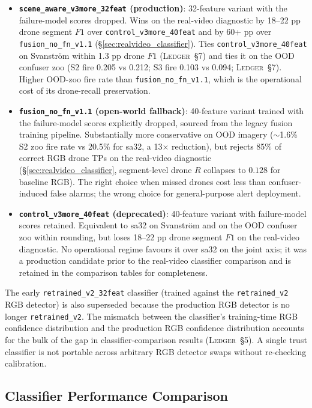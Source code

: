 \documentclass[12pt,a4paper,oneside,openright]{book}
\begin{document}
\begin{itemize}
    \item \textbf{\texttt{scene\_aware\_v3more\_32feat} (production)}: 32-feature variant with the failure-model scores dropped. Wins on the real-video diagnostic by 18--22 pp drone segment $F1$ over \texttt{control\_v3more\_40feat} and by 60+ pp over \texttt{fusion\_no\_fn\_v1.1} (\S\ref{sec:realvideo_classifier}). Ties \texttt{control\_v3more\_40feat} on Svanstr\"om within 1.3 pp drone $F1$ (\textsc{Ledger}~\S7) and ties it on the OOD confuser zoo (S2 fire 0.205 vs 0.212; S3 fire 0.103 vs 0.094; \textsc{Ledger}~\S7). Higher OOD-zoo fire rate than \texttt{fusion\_no\_fn\_v1.1}, which is the operational cost of its drone-recall preservation.
    \item \textbf{\texttt{fusion\_no\_fn\_v1.1} (open-world fallback)}: 40-feature variant trained with the failure-model scores explicitly dropped, sourced from the legacy fusion training pipeline. Substantially more conservative on OOD imagery ($\sim$1.6\% S2 zoo fire rate vs 20.5\% for sa32, a 13$\times$ reduction), but rejects 85\% of correct RGB drone TPs on the real-video diagnostic (\S\ref{sec:realvideo_classifier}, segment-level drone $R$ collapses to $0.128$ for baseline RGB). The right choice when missed drones cost less than confuser-induced false alarms; the wrong choice for general-purpose alert deployment.
    \item \textbf{\texttt{control\_v3more\_40feat} (deprecated)}: 40-feature variant with failure-model scores retained. Equivalent to sa32 on Svanstr\"om and on the OOD confuser zoo within rounding, but loses 18--22 pp drone segment $F1$ on the real-video diagnostic. No operational regime favours it over sa32 on the joint axis; it was a production candidate prior to the real-video classifier comparison and is retained in the comparison tables for completeness.
\end{itemize}

The early \texttt{retrained\_v2\_32feat} classifier (trained against the \texttt{retrained\_v2} RGB detector) is also superseded because the production RGB detector is no longer \texttt{retrained\_v2}. The mismatch between the classifier's training-time RGB confidence distribution and the production RGB confidence distribution accounts for the bulk of the gap in classifier-comparison results (\textsc{Ledger}~\S5). A single trust classifier is not portable across arbitrary RGB detector swaps without re-checking calibration.

\subsection{Classifier Performance Comparison}
\label{sec:classifier_compare}
\end{document}
